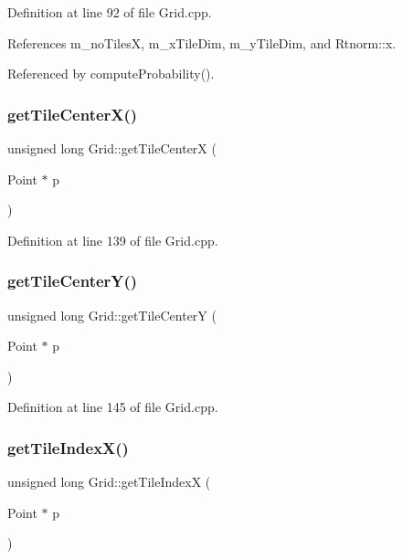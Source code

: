 Definition at line 92 of file Grid.\+cpp.



References m\+\_\+no\+TilesX, m\+\_\+x\+Tile\+Dim, m\+\_\+y\+Tile\+Dim, and Rtnorm\+::x.



Referenced by compute\+Probability().

\mbox{\label{class_grid_a7ceadaae2d94f814b7e9b69728cdb1be}} 
\subsubsection{getTileCenterX()}
{\footnotesize\ttfamily unsigned long Grid\+::get\+Tile\+CenterX (\begin{DoxyParamCaption}\item[{Point $\ast$}]{p }\end{DoxyParamCaption})}



Definition at line 139 of file Grid.\+cpp.

\mbox{\label{class_grid_a04b2390f9d507fffa738d2ec1c08f9b8}} 
\subsubsection{getTileCenterY()}
{\footnotesize\ttfamily unsigned long Grid\+::get\+Tile\+CenterY (\begin{DoxyParamCaption}\item[{Point $\ast$}]{p }\end{DoxyParamCaption})}



Definition at line 145 of file Grid.\+cpp.

\mbox{\label{class_grid_a960e14ae534b8f868910b410be06352a}} 
\subsubsection{getTileIndexX()}
{\footnotesize\ttfamily unsigned long Grid\+::get\+Tile\+IndexX (\begin{DoxyParamCaption}\item[{Point $\ast$}]{p }\end{DoxyParamCaption})}




